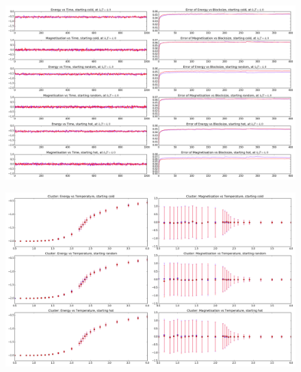\documentclass[11pt,notes]{beamer}
\begin{document}
\begin{frame}
	\begin{figure}
		\centering
		\includegraphics[width=1.0\textwidth]{Images/C4}
	\end{figure}
\end{frame}
\begin{frame}
\begin{figure}
	\centering
	\includegraphics[width=1.0\textwidth]{Images/CT}
\end{figure}
\end{frame}
\end{document}
